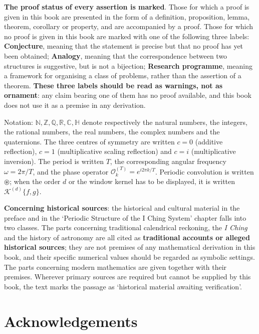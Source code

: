 \textbf{The proof status of every assertion is marked}. Those for which a proof is given in this book are presented in the form of a definition, proposition, lemma, theorem, corollary or property, and are accompanied by a proof. Those for which no proof is given in this book are marked with one of the following three labels: \textbf{Conjecture}, meaning that the statement is precise but that no proof has yet been obtained; \textbf{Analogy}, meaning that the correspondence between two structures is suggestive, but is not a bijection; \textbf{Research programme}, meaning a framework for organising a class of problems, rather than the assertion of a theorem. \textbf{These three labels should be read as warnings, not as ornament}: any claim bearing one of them has no proof available, and this book does not use it as a premise in any derivation.

Notation: $\mathbb{N}, \mathbb{Z}, \mathbb{Q}, \mathbb{R}, \mathbb{C}, \mathbb{H}$ denote respectively the natural numbers, the integers, the rational numbers, the real numbers, the complex numbers and the quaternions. The three centres of symmetry are written $c=0$ (additive reflection), $c=1$ (multiplicative scaling reflection) and $c=i$ (multiplicative inversion). The period is written $T$, the corresponding angular frequency $\omega = 2\pi/T$, and the phase operator $\mathcal{O}_k^{(T)} = e^{i2\pi k/T}$. Periodic convolution is written $\circledast$; when the order $d$ or the window kernel has to be displayed, it is written $\mathcal{K}^{(d)}\{f,g\}$.

\textbf{Concerning historical sources}: the historical and cultural material in the preface and in the `Periodic Structure of the I Ching System' chapter falls into two classes. The parts concerning traditional calendrical reckoning, the \textit{I Ching} and the history of astronomy are all cited as \textbf{traditional accounts or alleged historical sources}; they are not premises of any mathematical derivation in this book, and their specific numerical values should be regarded as symbolic settings. The parts concerning modern mathematics are given together with their premises. Wherever primary sources are required but cannot be supplied by this book, the text marks the passage as `historical material awaiting verification'.

\section*{Acknowledgements}

